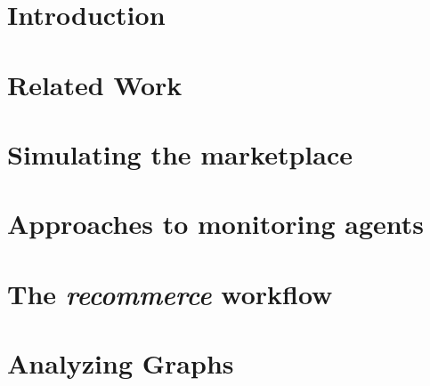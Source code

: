 \documentclass
[
    twoside,                 %
    openright,               %
    cleardoublepage = empty, %
    fontsize = 12 pt,        %
    british,                 %
    captions = tableheading, %
    numbers = noenddot,      %
    footheight = 35 pt,      %
]
{scrbook}
\begin{document}
\frontmatter


\pagestyle{plain}





% 

\tableofcontents

\pagestyle{headings}
\mainmatter


% 

\chapter{Introduction}


\chapter{Related Work}


\chapter{Simulating the marketplace}


\chapter{Approaches to monitoring agents}


\chapter{The \emph{recommerce} workflow}


\chapter{Analyzing Graphs}

\end{document}
